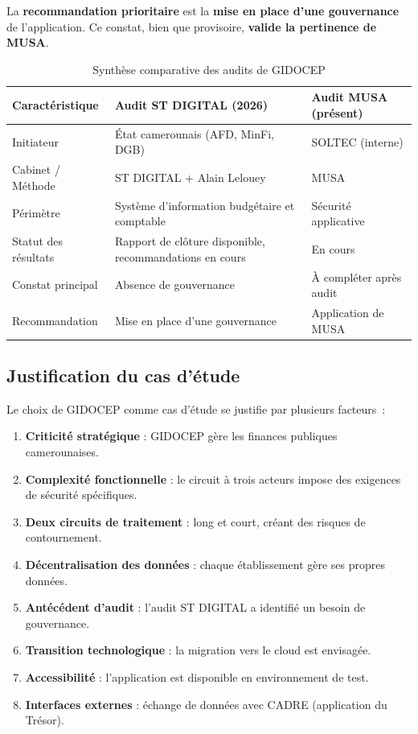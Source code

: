 \documentclass[12pt,a4paper,oneside]{report}
\begin{document}
La \textbf{recommandation prioritaire} est la \textbf{mise en place d'une gouvernance} de l'application. Ce constat, bien que provisoire, \textbf{valide la pertinence de MUSA}.

\begin{table}[H]
	\centering\small
	\caption{Synthèse comparative des audits de GIDOCEP}
	\label{tab:audits_gidocep}
	\begin{tabularx}{\textwidth}{p{3.5cm}p{4.5cm}X}
		\toprule
		\rowcolor{theadcolor}
		\color{white}\textbf{Caractéristique} &
		\color{white}\textbf{Audit ST DIGITAL (2026)} &
		\color{white}\textbf{Audit MUSA (présent)} \\
		\midrule
		Initiateur & État camerounais (AFD, MinFi, DGB) & SOLTEC (interne) \\
		Cabinet / Méthode & ST DIGITAL + Alain Lelouey & MUSA \\
		Périmètre & Système d'information budgétaire et comptable & Sécurité applicative \\
		Statut des résultats & Rapport de clôture disponible, recommandations en cours & En cours \\
		Constat principal & Absence de gouvernance & À compléter après audit \\
		Recommandation & Mise en place d'une gouvernance & Application de MUSA \\
		\bottomrule
	\end{tabularx}
\end{table}

\subsection{Justification du cas d'étude}

Le choix de GIDOCEP comme cas d'étude se justifie par plusieurs facteurs~:

\begin{enumerate}[label={\color{gold}\theenumi.}, leftmargin=*]
	\item \textbf{Criticité stratégique} : GIDOCEP gère les finances publiques camerounaises.
	\item \textbf{Complexité fonctionnelle} : le circuit à trois acteurs impose des exigences de sécurité spécifiques.
	\item \textbf{Deux circuits de traitement} : long et court, créant des risques de contournement.
	\item \textbf{Décentralisation des données} : chaque établissement gère ses propres données.
	\item \textbf{Antécédent d'audit} : l'audit ST DIGITAL a identifié un besoin de gouvernance.
	\item \textbf{Transition technologique} : la migration vers le cloud est envisagée.
	\item \textbf{Accessibilité} : l'application est disponible en environnement de test.
	\item \textbf{Interfaces externes} : échange de données avec CADRE (application du Trésor).
\end{enumerate}
\end{document}
